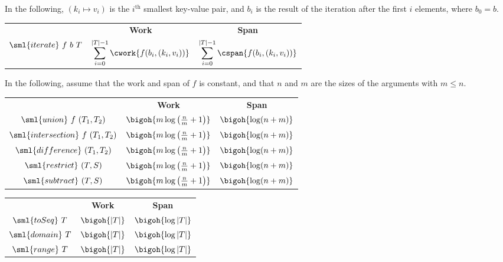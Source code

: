 \begin{cluster}
\label{grp:cst:treap-aug-table::iteration}

\begin{costspec}[Iteration]
\label{cst:treap-aug-table::iteration}
In the following, $(k_i \mapsto v_i)$ is the $i^\text{th}$ smallest key-value
pair, and $b_i$ is the result of the iteration after the first $i$ elements,
where $b_0 = b$.
\begin{tabular}{c|c|c}
& \textbf{Work} & \textbf{Span} \\
$\sml{iterate}~f~b~T$ &
$\displaystyle\sum_{i=0}^{|T|-1} \cwork{f(b_i, (k_i, v_i))}$ &
$\displaystyle\sum_{i=0}^{|T|-1} \cspan{f(b_i, (k_i, v_i))}$
\end{tabular}

\end{costspec}
\end{cluster}

\begin{cluster}
\label{grp:cst:treap-aug-table::combination}

\begin{costspec}[Combination]
\label{cst:treap-aug-table::combination}
In the following, assume that the work and span of $f$ is constant, and that
$n$ and $m$ are the sizes of the arguments with $m \leq n$.
\begin{tabular}{c|c|c}
& \textbf{Work} & \textbf{Span} \\
$\sml{union}~f~(T_1, T_2)$ &
$\bigoh{m \log\left(\frac n m + 1\right)}$ &
$\bigoh{\log(n + m)}$
\\
$\sml{intersection}~f~(T_1, T_2)$ &
$\bigoh{m \log\left(\frac n m + 1\right)}$ &
$\bigoh{\log(n + m)}$
\\
$\sml{difference}~(T_1, T_2)$ &
$\bigoh{m \log\left(\frac n m + 1\right)}$ &
$\bigoh{\log(n + m)}$
\\
$\sml{restrict}~(T, S)$ &
$\bigoh{m \log\left(\frac n m + 1\right)}$ &
$\bigoh{\log(n + m)}$
\\
$\sml{subtract}~(T, S)$ &
$\bigoh{m \log\left(\frac n m + 1\right)}$ &
$\bigoh{\log(n + m)}$
\end{tabular}

\end{costspec}
\end{cluster}

\begin{cluster}
\label{grp:cst:treap-aug-table::miscellaous}

\begin{costspec}[Miscellaous]
\label{cst:treap-aug-table::miscellaous}
\begin{tabular}{c|c|c}
& \textbf{Work} & \textbf{Span} \\
$\sml{toSeq}~T$ & $\bigoh{|T|}$ & $\bigoh{\log|T|}$ \\
$\sml{domain}~T$ & $\bigoh{|T|}$ & $\bigoh{\log|T|}$ \\
$\sml{range}~T$ & $\bigoh{|T|}$ & $\bigoh{\log|T|}$
\end{tabular}

\end{costspec}
\end{cluster}

